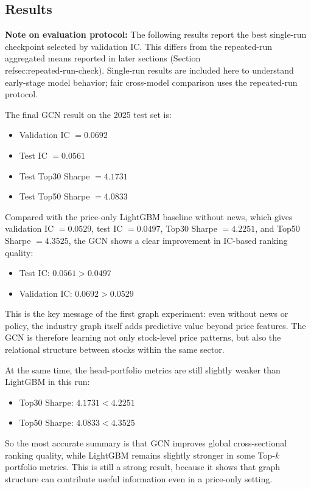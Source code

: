 \subsection{Results}

\textbf{Note on evaluation protocol:} The following results report the best single-run checkpoint selected by validation IC. This differs from the repeated-run aggregated means reported in later sections (Section \\ref{sec:repeated-run-check}). Single-run results are included here to understand early-stage model behavior; fair cross-model comparison uses the repeated-run protocol.

The final GCN result on the 2025 test set is:
\begin{itemize}
\item Validation IC $=0.0692$
\item Test IC $=0.0561$
\item Test Top30 Sharpe $=4.1731$
\item Test Top50 Sharpe $=4.0833$
\end{itemize}

Compared with the price-only LightGBM baseline without news, which gives validation IC $=0.0529$, test IC $=0.0497$, Top30 Sharpe $=4.2251$, and Top50 Sharpe $=4.3525$, the GCN shows a clear improvement in IC-based ranking quality:
\begin{itemize}
\item Test IC: $0.0561 > 0.0497$
\item Validation IC: $0.0692 > 0.0529$
\end{itemize}

This is the key message of the first graph experiment: even without news or policy, the industry graph itself adds predictive value beyond price features. The GCN is therefore learning not only stock-level price patterns, but also the relational structure between stocks within the same sector.

At the same time, the head-portfolio metrics are still slightly weaker than LightGBM in this run:
\begin{itemize}
\item Top30 Sharpe: $4.1731 < 4.2251$
\item Top50 Sharpe: $4.0833 < 4.3525$
\end{itemize}

So the most accurate summary is that GCN improves global cross-sectional ranking quality, while LightGBM remains slightly stronger in some Top-$k$ portfolio metrics. This is still a strong result, because it shows that graph structure can contribute useful information even in a price-only setting.

